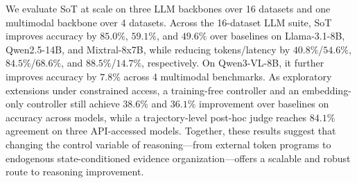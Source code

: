 We evaluate SoT at scale on three LLM backbones over 16 datasets and one multimodal backbone over 4 datasets. 
Across the 16-dataset LLM suite, SoT improves accuracy by \(85.0\%\), \(59.1\%\), and \(49.6\%\) over baselines on Llama-3.1-8B, Qwen2.5-14B, and Mixtral-8x7B, while reducing tokens/latency by \(40.8\%\)/\(54.6\%\), \(84.5\%\)/\(68.6\%\), and \(88.5\%\)/\(14.7\%\), respectively.
On Qwen3-VL-8B, it further improves accuracy by \(7.8\%\) across 4 multimodal benchmarks.
As exploratory extensions under constrained access, a training-free controller and an embedding-only controller still achieve \(38.6\%\) and \(36.1\%\) improvement over baselines on accuracy across models, while a trajectory-level post-hoc judge reaches \(84.1\%\) agreement on three API-accessed models.
Together, these results suggest that changing the control variable of reasoning—from external token programs to endogenous state-conditioned evidence organization—offers a scalable and robust route to reasoning improvement.




